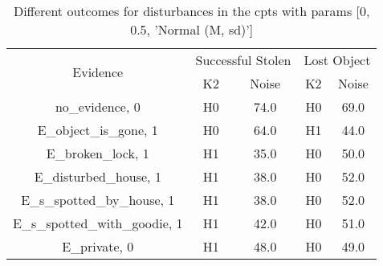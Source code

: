 \begin{table}\begin{tabular}{c|cc|cc}\toprule\multirow{2}{*}{Evidence} & \multicolumn{2}{c}{Successful Stolen} & \multicolumn{2}{c}{Lost Object} \\& {K2} & {Noise} & {K2} & {Noise} \\\midrule
no\_evidence, 0 & \cellcolor{Bittersweet}H0&\cellcolor{Bittersweet}74.0&\cellcolor{Bittersweet}H0&\cellcolor{Bittersweet}69.0\\E\_object\_is\_gone, 1 & \cellcolor{Bittersweet}H0&\cellcolor{Bittersweet}64.0&\cellcolor{Bittersweet}H1&\cellcolor{Bittersweet}44.0\\E\_broken\_lock, 1 & \cellcolor{Bittersweet}H1&\cellcolor{Bittersweet}35.0&\cellcolor{Bittersweet}H0&\cellcolor{Bittersweet}50.0\\E\_disturbed\_house, 1 & \cellcolor{Bittersweet}H1&\cellcolor{Bittersweet}38.0&\cellcolor{Bittersweet}H0&\cellcolor{Bittersweet}52.0\\E\_s\_spotted\_by\_house, 1 & \cellcolor{Bittersweet}H1&\cellcolor{Bittersweet}38.0&\cellcolor{Bittersweet}H0&\cellcolor{Bittersweet}52.0\\E\_s\_spotted\_with\_goodie, 1 & \cellcolor{Bittersweet}H1&\cellcolor{Bittersweet}42.0&\cellcolor{Bittersweet}H0&\cellcolor{Bittersweet}51.0\\E\_private, 0 & \cellcolor{Bittersweet}H1&\cellcolor{Bittersweet}48.0&\cellcolor{Bittersweet}H0&\cellcolor{Bittersweet}49.0\\\bottomrule\end{tabular}\caption{Different outcomes for disturbances in the cpts with params [0, 0.5, 'Normal (M, sd)']}\end{table}